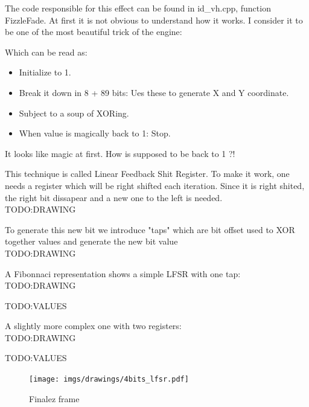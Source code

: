 The code responsible for this effect can be found in id\_vh.cpp, function FizzleFade. At first it is not obvious to understand how it works. I consider it to be one of the most beautiful trick of the engine:\\
\par
\begin{minipage}{\textwidth}

\end{minipage}
\par
Which can be read as:\\
\begin{itemize}
\item Initialize  to 1.
\item Break it down in 8 + 89 bits: Ues these to generate X and Y coordinate.
\item Subject  to a soup of XORing.
\item When  value is magically back to 1: Stop.
\end{itemize}        
It looks like magic at first. How is  supposed to be back to 1 ?!\\
\par
This technique is called Linear Feedback Shit Register. To make it work, one needs a register which will be right shifted each iteration. Since it is right shited, the right bit dissapear and a new one to the left is needed.\\
TODO:DRAWING\\
\par
To generate this new bit we introduce "taps" which are bit offset used to XOR together values and generate the new bit value\\
TODO:DRAWING\\
\par
A Fibonnaci representation shows a simple LFSR with one tap:\\
TODO:DRAWING\\
\par
TODO:VALUES\\
\par
A slightly more complex one with two registers:\\
TODO:DRAWING\\
\par
TODO:VALUES\\

\par

\begin{figure}[H]
 \centering
  \texttt{[image: imgs/drawings/4bits\_lfsr.pdf]}
 \caption{Finalez frame} 
\end{figure}

